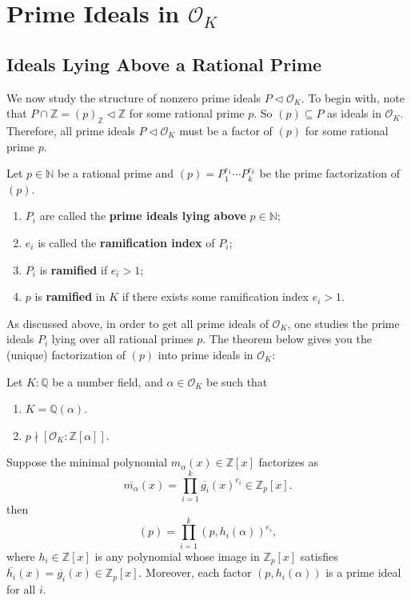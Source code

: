 \chapter{Prime Ideals in $\mathcal{O}_{K}$}
\section{Ideals Lying Above a Rational Prime}
We now study the structure of nonzero prime ideals $P\lhd \mathcal{O}_{K}$. To begin with, note that $P\cap \mathbb{Z}=(p)_{\mathbb{Z}}\lhd \mathbb{Z}$ for some rational prime $p$. So $(p)\subseteq P$ as ideals in $\mathcal{O}_{K}$. Therefore, all prime ideals $P\lhd \mathcal{O}_{K}$ must be a factor of $(p)$ for some rational prime $p$. 

\begin{definition}
    Let $p\in \mathbb{N}$ be a rational prime and $(p)=P_{1}^{e_{1}}\cdots P_{k}^{e_{k}}$ be the prime factorization of $(p)$. 
    \begin{enumerate}
        \item $P_{i}$ are called the {\bf prime ideals lying above} $p\in \mathbb{N}$; 
        \item $e_{i}$ is called the {\bf ramification index} of $P_{i}$;
        \item $P_{i}$ is {\bf ramified} if $e_{i}>1$;
        \item $p$ is {\bf ramified} in $K$ if there exists some ramification index $e_{i}>1$. 
    \end{enumerate}
\end{definition}

As discussed above, in order to get all prime ideals of $\mathcal{O}_K$, one studies the prime ideals $P_i$ lying over all rational primes $p$. The theorem below gives you the (unique) factorization of $(p)$ into prime ideals in $\mathcal{O}_K$:
\begin{theorem}\label{thm-factorizationOfRationalPrimes}
    Let $K:\mathbb{Q}$ be a number field, and $\alpha\in \mathcal{O}_{K}$ be such that
    \begin{enumerate}
        \item $K=\mathbb{Q}(\alpha)$. 
        \item $p\nmid [\mathcal{O}_{K}:\mathbb{Z}[\alpha]]$. 
    \end{enumerate}
    Suppose the minimal polynomial $m_{\alpha}(x)\in \mathbb{Z}[x]$ factorizes as 
        \[
        \overline{m_{\alpha}}(x)=\prod_{i=1}^{k}\overline{g_{i}}(x)^{e_{i}}\in \mathbb{Z}_{p}[x]. 
        \]
    then 
    \[
    (p)=\prod_{i=1}^{k}(p,h_{i}(\alpha))^{e_{i}},
    \]
    where $h_{i}\in \mathbb{Z}[x]$ is any polynomial whose image in $\mathbb{Z}_{p}[x]$ satisfies $\overline{h_{i}}(x)=\overline{g_{i}}(x)\in \mathbb{Z}_{p}[x]$. Moreover, each factor $(p,h_{i}(\alpha))$ is a prime ideal for all $i$. 
\end{theorem} 

